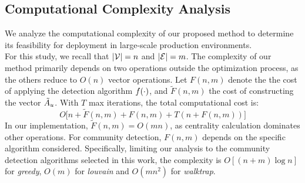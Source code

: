 \subsection{Computational Complexity Analysis}
\label{subsec:time_complexity}
We analyze the computational complexity of our proposed method to determine its feasibility for deployment in large-scale production environments. \\
For this study, we recall that $|\mathcal{V}| = n$ and $|\mathcal{E}| = m$. The complexity of our method primarily depends on two operations outside the optimization process, as the others reduce to $O(n)$ vector operations. Let $F(n,m)$ denote the the cost of applying the  detection algorithm $f(\cdot)$, and $\tilde{F}(n,m)$  the cost of constructing the vector $\tilde{A}_{u}$. 
With $T$ max iterations, the total computational cost is:
\begin{equation}
    O \bigg[ n + \tilde{F}(n,m) + F(n,m) + T ( n + F(n,m)) \bigg]
\end{equation}
In our implementation, $\tilde{F}(n,m) = O(mn)$, as centrality calculation dominates other operations. For community detection, $F(n,m)$ depends on the specific algorithm considered. Specifically, limiting our analysis to the community detection algorithms selected in this work, the complexity is $O[(n+m) \log n]$ for \textit{greedy}, $O(m)$ for \textit{louvain} and $O(mn^2)$ for \textit{walktrap}.






